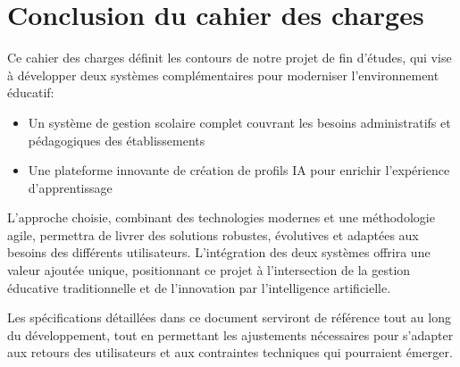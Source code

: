 \section{Conclusion du cahier des charges}

Ce cahier des charges définit les contours de notre projet de fin d'études, qui vise à développer deux systèmes complémentaires pour moderniser l'environnement éducatif:

\begin{itemize}
  \item Un système de gestion scolaire complet couvrant les besoins administratifs et pédagogiques des établissements
  
  \item Une plateforme innovante de création de profils IA pour enrichir l'expérience d'apprentissage
\end{itemize}

L'approche choisie, combinant des technologies modernes et une méthodologie agile, permettra de livrer des solutions robustes, évolutives et adaptées aux besoins des différents utilisateurs. L'intégration des deux systèmes offrira une valeur ajoutée unique, positionnant ce projet à l'intersection de la gestion éducative traditionnelle et de l'innovation par l'intelligence artificielle.

Les spécifications détaillées dans ce document serviront de référence tout au long du développement, tout en permettant les ajustements nécessaires pour s'adapter aux retours des utilisateurs et aux contraintes techniques qui pourraient émerger. 